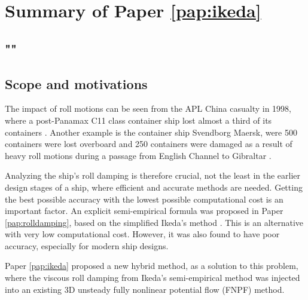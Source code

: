 \section{Summary of Paper \ref{pap:ikeda}}
\subsection*{""}
\subsection*{Scope and motivations}
The impact of roll motions can be seen from the APL China casualty in 1998, where a post-Panamax C11 class container ship lost almost a third of its containers \cite{france_investigation_2001}. Another example is the container ship Svendborg Maersk, were 500 containers were lost overboard and 250 containers were damaged as a result of heavy roll motions during a passage from English Channel to Gibraltar \cite{danish_maritime_accident_investigation_board_marine_2014}.

Analyzing the ship's roll damping is therefore crucial, not the least in the earlier design stages of a ship, where efficient and accurate methods are needed. 
Getting the best possible accuracy with the lowest possible computational cost is an important factor. An explicit semi-empirical formula was proposed in Paper \ref{pap:rolldamping}, based on the simplified Ikeda's method \cite{kawahara_simple_2011}. This is an alternative with very low computational cost. However, it was also found to have poor accuracy, especially for modern ship designs. 

Paper \ref{pap:ikeda} proposed a new hybrid method, as a solution to this problem, where the viscous roll damping from Ikeda’s semi-empirical method was injected into an existing 3D unsteady fully nonlinear potential flow (FNPF) method.

